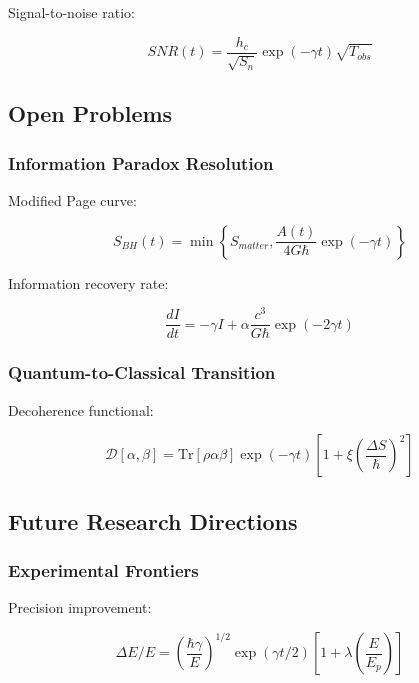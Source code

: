 \documentclass[12pt]{article}
\theoremstyle{plain}
\theoremstyle{definition}
\theoremstyle{remark}
\begin{document}
Signal-to-noise ratio:

\begin{equation}
SNR(t) = \frac{h_c}{\sqrt{S_n}}\exp(-\gamma t)\sqrt{T_{obs}}
\end{equation}

\subsection{Open Problems}

\subsubsection{Information Paradox Resolution}

Modified Page curve:

\begin{equation}
S_{BH}(t) = \min\left\{S_{matter}, \frac{A(t)}{4G\hbar}\exp(-\gamma t)\right\}
\end{equation}

Information recovery rate:

\begin{equation}
\frac{dI}{dt} = -\gamma I + \alpha\frac{c^3}{G\hbar}\exp(-2\gamma t)
\end{equation}

\subsubsection{Quantum-to-Classical Transition}

Decoherence functional:

\begin{equation}
\mathcal{D}[\alpha,\beta] = \text{Tr}[\rho\alpha\beta]\exp(-\gamma t)\left[1 + \xi\left(\frac{\Delta S}{\hbar}\right)^2\right]
\end{equation}

\subsection{Future Research Directions}

\subsubsection{Experimental Frontiers}

Precision improvement:

\begin{equation}
\Delta E/E = \left(\frac{\hbar\gamma}{E}\right)^{1/2}\exp(\gamma t/2)\left[1 + \lambda\left(\frac{E}{E_p}\right)\right]
\end{equation}
\end{document}
